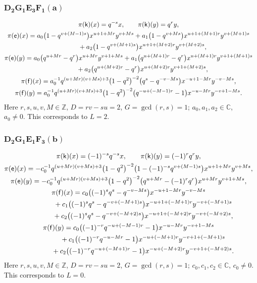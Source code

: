 \documentclass[pdftex]{sigma}
\numberwithin{equation}{section}
\begin{document}
\subsubsection*{$\boldsymbol{D_2G_1E_3F_1(a)}$}
\begin{gather*}
\pi(\mathsf{k})(x)= q^{-s}x ,\qquad\pi(\mathsf{k})(y)=q^ry ,\\
\pi(\mathsf{e})(x)= a_0\big(1-q^{v+(M-1)s}\big)x^{u+1+Mr}y^{v+Ms}+ a_1\big(1-q^{v+Ms}\big)x^{u+1+(M+1)r}y^{v+(M+1)s}\\
\hphantom{\pi(\mathsf{e})(x)=}{}+ a_2\big(1-q^{v+(M+1)s}\big)x^{u+1+(M+2)r}y^{v+(M+2)s} ,\\
\pi(\mathsf{e})(y)= a_0\big(q^{u+Mr}-q^r\big)x^{u+Mr}y^{v+1+Ms}+ a_1\big(q^{u+(M+1)r}-q^r\big)x^{u+(M+1)r}y^{v+1+(M+1)s}\\
\hphantom{\pi(\mathsf{e})(y)=}{} + a_2\big(q^{u+(M+2)r}-q^r\big)x^{u+(M+2)r}y^{v+1+(M+2)s} ,\\
\pi(\mathsf{f})(x)= a_0^{-1}q^{(u+Mr)(v+Ms)+3}\big(1-q^2\big)^{-2}\big(q^s-q^{-v-Ms}\big)x^{-u+1-Mr}y^{-v-Ms} ,\\
\pi(\mathsf{f})(y)= a_0^{-1}q^{(u+Mr)(v+Ms)+3}\big(1-q^2\big)^{-2}\big(q^{-u+(-M-1)r}-1\big)x^{-u-Mr}y^{-v+1-Ms} .
\end{gather*}
Here $r,s,u,v,M\in\mathbb{Z}$, $D=rv-su=2$, $G=\operatorname{gcd}(r,s)=1$; $a_0,a_1,a_2\in\mathbb{C}$, $a_0\ne 0$. This corresponds to $L=2$.

\subsubsection*{$\boldsymbol{D_2G_1E_1F_3(b)}$}
\begin{gather*}
\pi(\mathsf{k})(x)= (-1)^{-s}q^{-s}x ,\qquad\pi(\mathsf{k})(y)=(-1)^rq^ry ,\\
\pi(\mathsf{e})(x)= -c_0^{-1}q^{(u+Mr)(v+Ms)+3}\big(1-q^2\big)^{-2}\big(1-(-1)^{-s}q^{v+(M-1)s}\big)x^{u+1+Mr}y^{v+Ms} ,\\
\pi(\mathsf{e})(y)= -c_0^{-1}q^{(u+Mr)(v+Ms)+3}\big(1-q^2\big)^{-2}\big(q^{u+Mr}-(-1)^rq^r\big)x^{u+Mr}y^{v+1+Ms} ,\\
\pi(\mathsf{f})(x)= c_0\big((-1)^sq^s-q^{-v-Ms}\big)x^{-u+1-Mr}y^{-v-Ms}\\
\hphantom{\pi(\mathsf{f})(x)=}{}+ c_1\big((-1)^sq^s-q^{-v+(-M+1)s}\big)x^{-u+1+(-M+1)r}y^{-v+(-M+1)s}\\
\hphantom{\pi(\mathsf{f})(x)=}{}+ c_2\big((-1)^sq^s-q^{-v+(-M+2)s}\big)x^{-u+1+(-M+2)r}y^{-v+(-M+2)s} ,\\
\pi(\mathsf{f})(y)= c_0\big((-1)^{-r}q^{-u+(-M-1)r}-1\big)x^{-u-Mr}y^{-v+1-Ms}\\
\hphantom{\pi(\mathsf{f})(y)=}{}+ c_1\big((-1)^{-r}q^{-u-Mr}-1\big)x^{-u+(-M+1)r}y^{-v+1+(-M+1)s}\\
\hphantom{\pi(\mathsf{f})(y)=}{}+ c_2\big((-1)^{-r}q^{-u+(-M+1)r}-1\big)x^{-u+(-M+2)r}y^{-v+1+(-M+2)s} .
\end{gather*}
Here $r,s,u,v,M\in\mathbb{Z}$, $D=rv-su=2$, $G=\operatorname{gcd}(r,s)=1$; $c_0,c_1,c_2\in\mathbb{C}$, $c_0\ne 0$. This corresponds to $L=0$.
\end{document}
